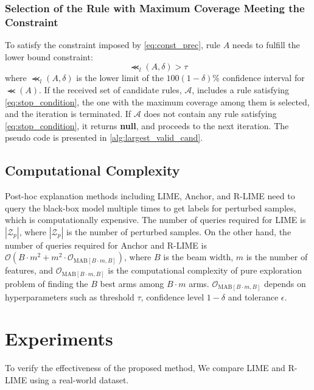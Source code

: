 \documentclass[11pt]{article}
\begin{document}
\subsubsection{Selection of the Rule with Maximum Coverage Meeting the Constraint}
To satisfy the constraint imposed by \cref{eq:const_prec}, rule $A$ needs to fulfill the lower bound constraint:
\begin{equation}
	\Prec_{l}(A,\delta)>\tau
	\label{eq:stop_condition}
\end{equation}
where $\Prec_{l}(A,\delta)$ is the lower limit of
the $100(1-\delta)$\% confidence interval for $\Prec(A)$.
If the received set of candidate rules, $\mathcal{A}$,
includes a rule satisfying \cref{eq:stop_condition},
the one with the maximum coverage among them is selected,
and the iteration is terminated.
If $\mathcal{A}$ does not contain any rule satisfying \cref{eq:stop_condition},
it returns \textbf{null},
and proceeds to the next iteration.
The pseudo code is presented in \cref{alg:largest_valid_cand}.


\ifnum{}
	\subsection{Computational Complexity}
	Post-hoc explanation methods including LIME, Anchor, and R-LIME
	need to query the black-box model multiple times
	to get labels for perturbed samples, which is computationally expensive.
	The number of queries required for LIME is $|\mathcal{Z}_p|$,
	where $|\mathcal{Z}_p|$ is the number of perturbed samples.
	On the other hand,
	the number of queries required for Anchor and R-LIME is
	$\mathcal{O}(B\cdot m^2+m^2\cdot\mathcal{O}_{\mathrm{MAB}[B\cdot m,B]})$,
	where $B$ is the beam width, $m$ is the number of features, and
	$\mathcal{O}_{\mathrm{MAB}[B\cdot m,B]}$ is the computational complexity of
	pure exploration problem of finding the $B$ best arms among $B\cdot m$ arms.
	$\mathcal{O}_{\mathrm{MAB}[B\cdot m,B]}$ depends on hyperparameters
	such as threshold $\tau$, confidence level $1-\delta$ and tolerance $\epsilon$.
\fi

\section{Experiments}
To verify the effectiveness of the proposed method,
We compare LIME and R-LIME using a real-world dataset.
\end{document}
